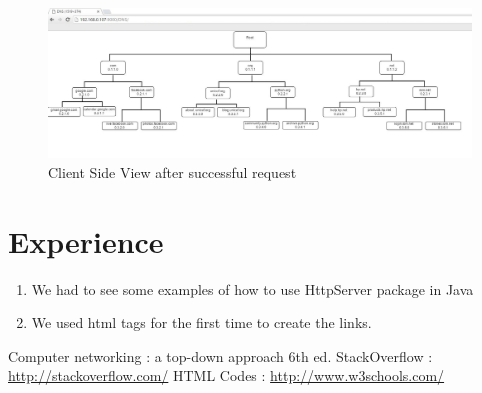 \documentclass[11pt]{article}
\begin{document}
\begin{figure}[!h]
\centering
\includegraphics[width=\textwidth]{Result.JPG}
\caption{Client Side View after successful request}
\end{figure}


\newpage
\section{Experience}
\begin{enumerate}
\item We had to see some examples of how to use HttpServer package in Java
\item We used html tags for the first time to create the links.
\end{enumerate}

\begin{thebibliography}{1}
  Computer networking : a top-down approach 6th ed.
 StackOverflow : \url{http://stackoverflow.com/}
 HTML Codes : \url{http://www.w3schools.com/}
\end{thebibliography}
\end{document}
